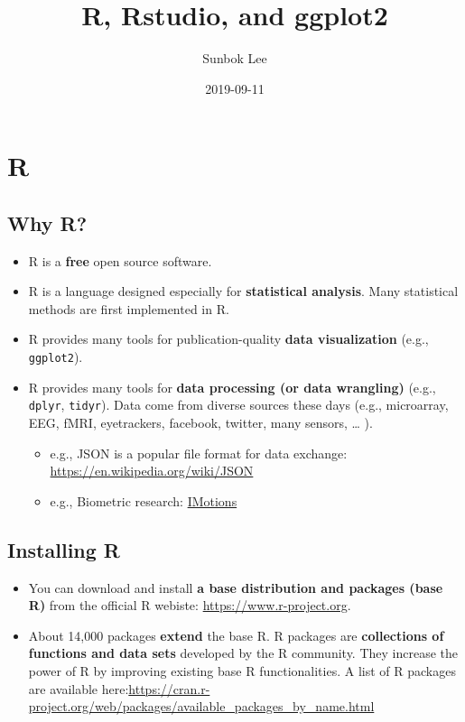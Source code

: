 \documentclass[]{book}
\title{R, Rstudio, and ggplot2}
\author{Sunbok Lee}
\date{2019-09-11}
\providecommand{\tightlist}{%
  \setlength{\itemsep}{0pt}\setlength{\parskip}{0pt}}
\begin{document}
\maketitle

{
\setcounter{tocdepth}{1}
\tableofcontents
}
\hypertarget{r}{%
\chapter{R}\label{r}}

\hypertarget{why-r}{%
\section{Why R?}\label{why-r}}

\begin{itemize}
\tightlist
\item
  R is a \textbf{free} open source software.
\item
  R is a language designed especially for \textbf{statistical analysis}. Many statistical methods are first implemented in R.
\item
  R provides many tools for publication-quality \textbf{data visualization} (e.g., \texttt{ggplot2}).
\item
  R provides many tools for \textbf{data processing (or data wrangling)} (e.g., \texttt{dplyr}, \texttt{tidyr}). Data come from diverse sources these days (e.g., microarray, EEG, fMRI, eyetrackers, facebook, twitter, many sensors, \ldots{} ).

  \begin{itemize}
  \tightlist
  \item
    e.g., JSON is a popular file format for data exchange: \url{https://en.wikipedia.org/wiki/JSON}
  \item
    e.g., Biometric research: \href{https://imotions.com/?creative=287840870074\&keyword=imotions\&matchtype=p\&network=g\&device=c\&gclid=EAIaIQobChMI3pas5oOO5AIVlBx9Ch28hwboEAAYASAAEgJlUfD_BwE}{IMotions}
  \end{itemize}
\end{itemize}

\hypertarget{installing-r}{%
\section{Installing R}\label{installing-r}}

\begin{itemize}
\item
  You can download and install \textbf{a base distribution and packages (base R)} from the official R webiste: \url{https://www.r-project.org}.
\item
  About 14,000 packages \textbf{extend} the base R. R packages are \textbf{collections of functions and data sets} developed by the R community. They increase the power of R by improving existing base R functionalities. A list of R packages are available here:\url{https://cran.r-project.org/web/packages/available_packages_by_name.html}
\end{itemize}
\end{document}
